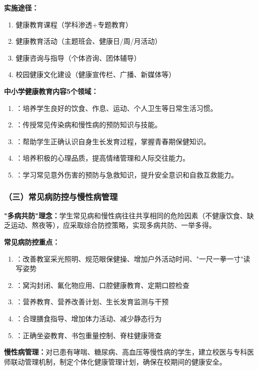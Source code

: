 \begin{keybox}
\textbf{实施途径：}
\begin{enumerate}[leftmargin=*]
    \item 健康教育课程（学科渗透+专题教育）
    \item 健康教育活动（主题班会、健康日/周/月活动）
    \item 健康咨询与指导（个体咨询、团体辅导）
    \item 校园健康文化建设（健康宣传栏、广播、新媒体等）
\end{enumerate}

\vspace{4pt}
\textbf{中小学健康教育内容5个领域：}
\begin{enumerate}[leftmargin=*]
    \item {}：培养学生良好的饮食、作息、运动、个人卫生等日常生活习惯。
    \item {}：传授常见传染病和慢性病的预防知识与技能。
    \item {}：帮助学生正确认识自身生长发育过程，掌握青春期保健知识。
    \item {}：培养积极的心理品质，提高情绪管理和人际交往能力。
    \item {}：学习常见意外伤害的预防与急救知识，提升安全意识和自救互救能力。
\end{enumerate}
\end{keybox}

\subsubsection{（三）常见病防控与慢性病管理}

\begin{keybox}
\textbf{"多病共防"理念：}学生常见病和慢性病往往共享相同的危险因素（不健康饮食、缺乏运动、熬夜等），应采取综合防控策略，实现多病共防、一举多得。

\textbf{常见病防控重点：}
\begin{enumerate}[leftmargin=*]
    \item {}：改善教室采光照明、规范眼保健操、增加户外活动时间、"一尺一拳一寸"读写姿势
    \item {}：窝沟封闭、氟化物应用、口腔健康教育、定期口腔检查
    \item {}：营养教育、营养改善计划、生长发育监测与干预
    \item {}：合理膳食指导、增加体力活动、减少静态行为
    \item {}：正确坐姿教育、书包重量控制、脊柱健康筛查
\end{enumerate}

\textbf{慢性病管理：}对已患有哮喘、糖尿病、高血压等慢性病的学生，建立校医与专科医师联动管理机制，制定个体化健康管理计划，确保在校期间的健康安全。
\end{keybox}

